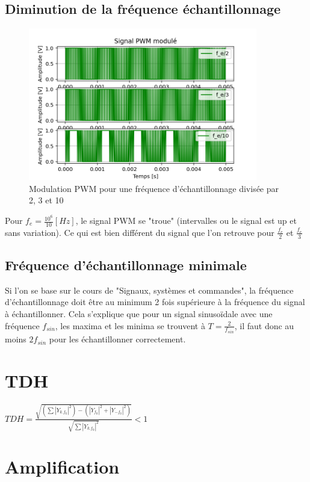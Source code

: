 \documentclass[a4paper,12pt,oneside]{report}	%
\begin{document}
        \subsection{Diminution de la fréquence échantillonnage}
            \begin{figure}[h!]
                \centering
                \includegraphics[width=10cm]{code-projet-python/1.1.5 - PWM btw sin and tri.png}
                \caption{Modulation PWM pour une fréquence d’échantillonnage divisée par 2, 3 et 10}
                \label{fig:comp_freq_echant}
            \end{figure}
            Pour $f_e = \frac{10^6}{10} [Hz]$, le signal PWM se "troue" (intervalles ou le signal est up et sans variation). Ce qui est bien différent du signal que l'on retrouve pour $\frac{f_e}{2}$ et $\frac{f_e}{3}$
        \subsection{Fréquence d’échantillonnage minimale}
            Si l'on se base sur le cours de "Signaux, systèmes et commandes", la fréquence d’échantillonnage doit être au minimum 2 fois supérieure à la fréquence du signal à échantillonner. Cela s'explique que pour un signal sinusoïdale avec une fréquence $f_{sin}$, les maxima et les minima se trouvent à $T = \frac{2}{f_{sin}}$, il faut donc au moins $2f_{sin}$ pour les échantillonner correctement. 
    \section{TDH}
        $TDH = \frac{\sqrt{(\sum |Y_{k.f_0}|^2)-(|Y_{f_0}|^2+|Y_{-f_0}|^2)}}{\sqrt{\sum|Y_{k.f_0}|^2}}<1$
\newpage
    \section{Amplification}
\end{document}
